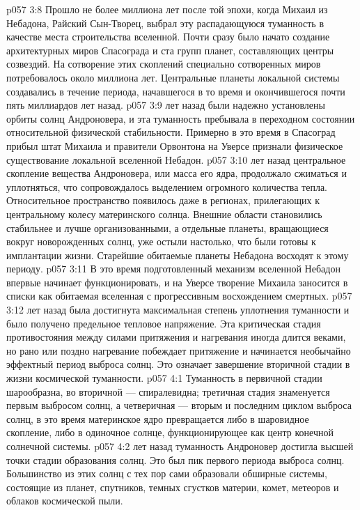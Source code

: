 \vs p057 3:8 Прошло не более миллиона лет после той эпохи, когда Михаил из Небадона, Райский Сын\hyp{}Творец, выбрал эту распадающуюся туманность в качестве места строительства вселенной. Почти сразу было начато создание архитектурных миров Спасограда и ста групп планет, составляющих центры созвездий. На сотворение этих скоплений специально сотворенных миров потребовалось около миллиона лет. Центральные планеты локальной системы создавались в течение периода, начавшегося в то время и окончившегося почти пять миллиардов лет назад.
\vs p057 3:9 \pc {} лет назад были надежно установлены орбиты солнц Андроновера, и эта туманность пребывала в переходном состоянии относительной физической стабильности. Примерно в это время в Спасоград прибыл штат Михаила и правители Орвонтона на Уверсе признали физическое существование локальной вселенной Небадон.
\vs p057 3:10 \pc {} лет назад центральное скопление вещества Андроновера, или масса его ядра, продолжало сжиматься и уплотняться, что сопровождалось выделением огромного количества тепла. Относительное пространство появилось даже в регионах, прилегающих к центральному колесу материнского солнца. Внешние области становились стабильнее и лучше организованными, а отдельные планеты, вращающиеся вокруг новорожденных солнц, уже остыли настолько, что были готовы к имплантации жизни. Старейшие обитаемые планеты Небадона восходят к этому периоду.
\vs p057 3:11 В это время подготовленный механизм вселенной Небадон впервые начинает функционировать, и на Уверсе творение Михаила заносится в списки как обитаемая вселенная с прогрессивным восхождением смертных.
\vs p057 3:12 \pc {} лет назад была достигнута максимальная степень уплотнения туманности и было получено предельное тепловое напряжение. Эта критическая стадия противостояния между силами притяжения и нагревания иногда длится веками, но рано или поздно нагревание побеждает притяжение и начинается необычайно эффектный период выброса солнц. Это означает завершение вторичной стадии в жизни космической туманности.
\vs p057 4:1 Туманность в первичной стадии шарообразна, во вторичной --- спиралевидна; третичная стадия знаменуется первым выбросом солнц, а четверичная --- вторым и последним циклом выброса солнц, в это время материнское ядро превращается либо в шаровидное скопление, либо в одиночное солнце, функционирующее как центр конечной солнечной системы.
\vs p057 4:2 \pc {} лет назад туманность Андроновер достигла высшей точки стадии образования солнц. Это был пик первого периода выброса солнц. Большинство из этих солнц с тех пор сами образовали обширные системы, состоящие из планет, спутников, темных сгустков материи, комет, метеоров и облаков космической пыли.
